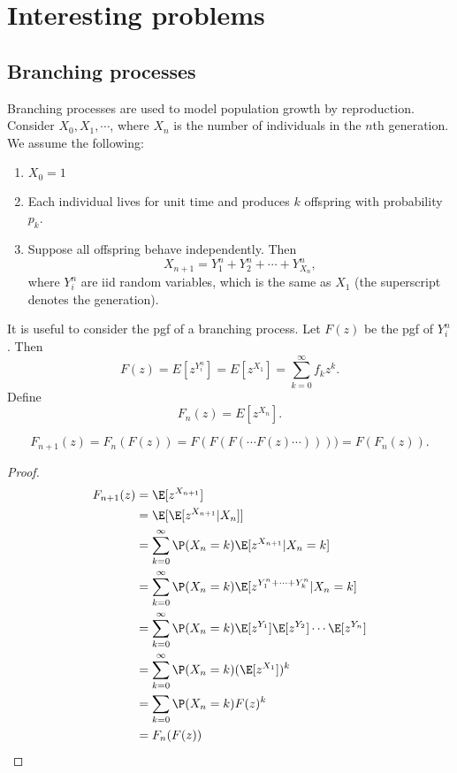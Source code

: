 \documentclass[a4paper]{article}
\begin{document}
\section{Interesting problems}
\subsection{Branching processes}
Branching processes are used to model population growth by reproduction. Consider $X_0, X_1, \cdots$, where $X_n$ is the number of individuals in the $n$th generation. We assume the following:
\begin{enumerate}
  \item $X_0 = 1$
  \item Each individual lives for unit time and produces $k$ offspring with probability $p_k$.
  \item Suppose all offspring behave independently. Then
    \[
      X_{n + 1} = Y_1^n + Y_2^n + \cdots + Y_{X_n}^n,
    \]
    where $Y_i^n$ are iid random variables, which is the same as $X_1$ (the superscript denotes the generation).
\end{enumerate}
It is useful to consider the pgf of a branching process. Let $F(z)$ be the pgf of $Y_i^n$. Then
\[
  F(z) = E[z^{Y_i^n}] = E[z^{X_1}] = \sum_{k = 0}^\infty f_k z^k.
\]
Define
\[
  F_n(z) = E[z^{X_n}].
\]
\begin{thm}
  \[
    F_{n + 1}(z) = F_n(F(z)) = F(F(F(\cdots F(z) \cdots )))) = F(F_n(z)).
  \]
\end{thm}

\begin{proof}
  \begin{align*}
    F_{n + 1}(z) &= \E[z^{X_{n + 1}}]\\
    &= \E[\E[z^{X_{n + 1}}|X_n]]\\
    &= \sum_{k = 0}^\infty \P(X_n = k)\E[z^{X_{n + 1}}|X_n = k]\\
    &= \sum_{k = 0}^\infty \P(X_n = k)\E[z^{Y_1^n + \cdots + Y_k^n}|X_n = k]\\
    &= \sum_{k = 0}^\infty \P(X_n = k)\E[z^{Y_1}]\E[z^{Y_2}]\cdots\E[z^{Y_n}]\\
    &= \sum_{k = 0}^\infty \P(X_n = k)(\E[z^{X_1}])^k\\
    &= \sum_{k = 0}\P(X_n = k)F(z)^k\\
    &= F_n(F(z))
  \end{align*}
\end{proof}
\end{document}
